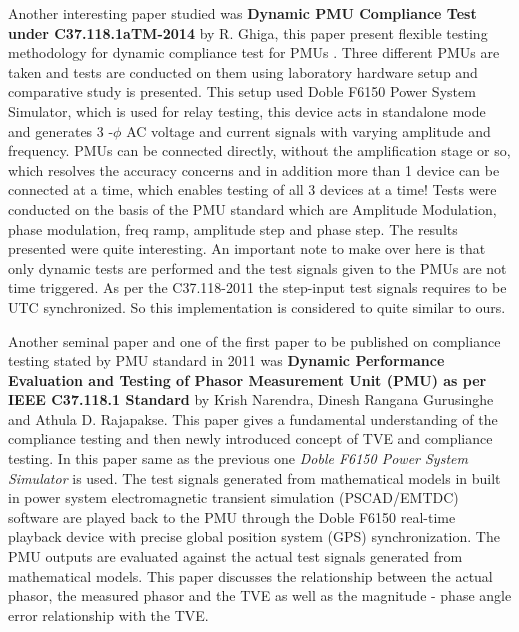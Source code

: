 Another interesting paper studied was \textbf{Dynamic PMU Compliance Test under C37.118.1aTM-2014} by R. Ghiga, this paper present flexible testing methodology for dynamic compliance test for PMUs \cite{Paper:ghiga}. Three different PMUs are taken and tests are conducted on them using laboratory hardware setup and comparative study is presented. This setup used Doble F6150 Power System Simulator, which is used for relay testing, this device acts in standalone mode and generates 3 -$\phi$ AC voltage and current signals with varying amplitude and frequency. PMUs can be connected directly, without the amplification stage or so, which resolves the accuracy concerns and in addition more than 1 device can be connected at a time, which enables testing of all 3 devices at a time! Tests were conducted on the basis of the PMU standard which are Amplitude Modulation, phase modulation, freq ramp, amplitude step and phase step. The results presented were quite interesting. An important note to make over here is that only dynamic tests are performed and the test signals given to the PMUs are not time triggered. As per the C37.118-2011 the step-input test signals requires to be UTC synchronized. So this implementation is considered to quite similar to ours.

Another seminal paper and one of the first paper to be published on compliance testing stated by PMU standard in 2011 was \textbf{Dynamic Performance Evaluation and Testing of Phasor Measurement Unit (PMU) as per IEEE C37.118.1 Standard} by Krish Narendra, Dinesh Rangana Gurusinghe and Athula D. Rajapakse. This paper gives a fundamental understanding of the compliance testing and then newly introduced concept of TVE and compliance testing. In this paper same as the previous one \textit{Doble F6150 Power System Simulator} is used.  The test signals generated from mathematical models in built in power system electromagnetic transient simulation (PSCAD/EMTDC) software are played back to the PMU through the Doble F6150 real-time playback device with precise global position system (GPS) synchronization. The PMU outputs are evaluated against the actual test signals generated from mathematical models. This paper discusses the relationship between the actual phasor, the measured phasor and the TVE as well as the magnitude - phase angle error relationship with the TVE.


